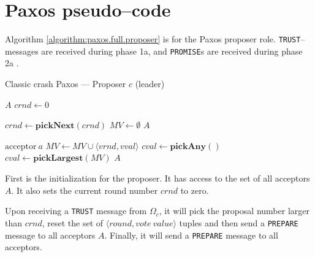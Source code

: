 \section{Paxos pseudo--code}

Algorithm \ref{algorithm:paxos.full.proposer} is for the Paxos proposer
role.  \texttt{TRUST}--messages are received during phase 1a, and
\texttt{PROMISE}s are received during phase 2a \cite{Lam01}.

\begin{algorithm}
  \caption{Classic crash Paxos --- Proposer $c$ (leader)}
  \label{algorithm:paxos.full.proposer}
  \begin{algorithmic}

    \State $A$
    \State $crnd \gets 0$
    \State

      \State $crnd \gets \textbf{pickNext}(crnd)$
      \State $MV \gets \emptyset$
      \State {}
                    {$A$}
    \EndOn
    \State

       {$\text{acceptor}\ a$}
        \State $MV \gets MV \cup \langle vrnd, vval \rangle$
            \State $cval \gets \textbf{pickAny}()$
          \Else
            \State $cval \gets \textbf{pickLargest}(MV)$
          \EndIf
         \State {}
                       {$A$}
        \EndIf
      \EndIf
    \EndOn

  \end{algorithmic}
\end{algorithm}

First is the initialization for the proposer. It has access to the set of
all acceptors $A$.  It also sets the current round number $crnd$ to
zero.

Upon receiving a \texttt{TRUST} message from $\Omega_c$, it will
pick the proposal number larger than $crnd$, reset the set of $\langle round, vote~value\rangle$ tuples and then send a \texttt{PREPARE} message to all
acceptors $A$.  Finally, it will send a \texttt{PREPARE} message to all
acceptors.

